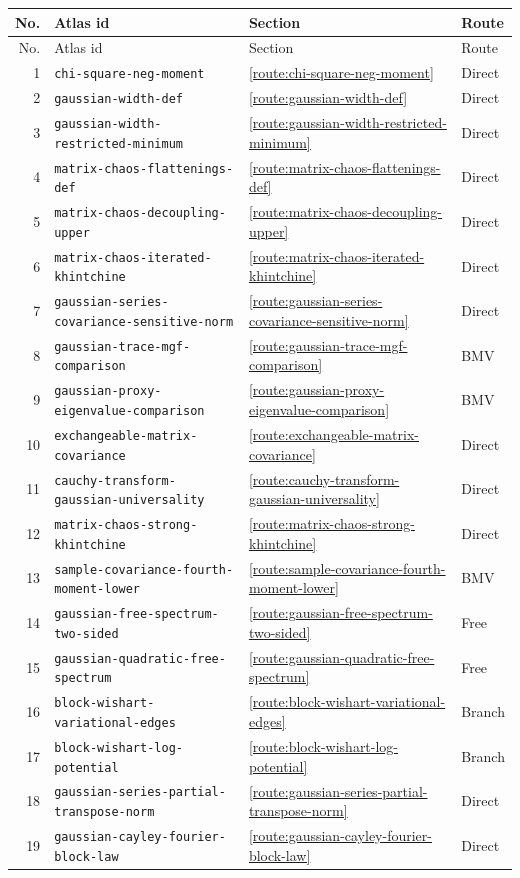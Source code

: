 \documentclass[11pt,a4paper]{article}
\DeclareRobustCommand{\code}[1]{{\footnotesize\urlstyle{tt}\nolinkurl{#1}}}
\begin{document}
\begin{longtable}{@{}r p{} l l@{}}
\toprule
No. & Atlas id & Section & Route \\
\midrule
\endfirsthead
\toprule
No. & Atlas id & Section & Route \\
\midrule
\endhead
1 & \code{chi-square-neg-moment} & \ref{route:chi-square-neg-moment} & Direct \\
2 & \code{gaussian-width-def} & \ref{route:gaussian-width-def} & Direct \\
3 & \code{gaussian-width-restricted-minimum} & \ref{route:gaussian-width-restricted-minimum} & Direct \\
4 & \code{matrix-chaos-flattenings-def} & \ref{route:matrix-chaos-flattenings-def} & Direct \\
5 & \code{matrix-chaos-decoupling-upper} & \ref{route:matrix-chaos-decoupling-upper} & Direct \\
6 & \code{matrix-chaos-iterated-khintchine} & \ref{route:matrix-chaos-iterated-khintchine} & Direct \\
7 & \code{gaussian-series-covariance-sensitive-norm} & \ref{route:gaussian-series-covariance-sensitive-norm} & Direct \\
8 & \code{gaussian-trace-mgf-comparison} & \ref{route:gaussian-trace-mgf-comparison} & BMV \\
9 & \code{gaussian-proxy-eigenvalue-comparison} & \ref{route:gaussian-proxy-eigenvalue-comparison} & BMV \\
10 & \code{exchangeable-matrix-covariance} & \ref{route:exchangeable-matrix-covariance} & Direct \\
11 & \code{cauchy-transform-gaussian-universality} & \ref{route:cauchy-transform-gaussian-universality} & Direct \\
12 & \code{matrix-chaos-strong-khintchine} & \ref{route:matrix-chaos-strong-khintchine} & Direct \\
13 & \code{sample-covariance-fourth-moment-lower} & \ref{route:sample-covariance-fourth-moment-lower} & BMV \\
14 & \code{gaussian-free-spectrum-two-sided} & \ref{route:gaussian-free-spectrum-two-sided} & Free \\
15 & \code{gaussian-quadratic-free-spectrum} & \ref{route:gaussian-quadratic-free-spectrum} & Free \\
16 & \code{block-wishart-variational-edges} & \ref{route:block-wishart-variational-edges} & Branch \\
17 & \code{block-wishart-log-potential} & \ref{route:block-wishart-log-potential} & Branch \\
18 & \code{gaussian-series-partial-transpose-norm} & \ref{route:gaussian-series-partial-transpose-norm} & Direct \\
19 & \code{gaussian-cayley-fourier-block-law} & \ref{route:gaussian-cayley-fourier-block-law} & Direct \\
\bottomrule
\end{longtable}
\normalsize
\clearpage
\end{document}
